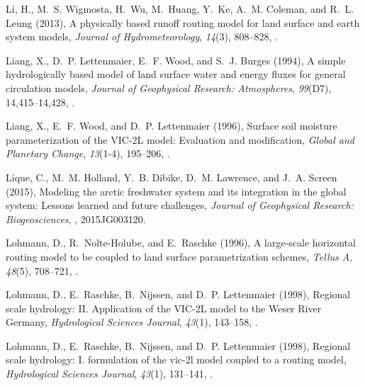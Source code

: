 \documentclass[jgrga, draft]{agutex}
\begin{document}
\begin{article}
\begin{thebibliography}{79}
Li, H., M.~S. Wigmosta, H.~Wu, M.~Huang, Y.~Ke, A.~M. Coleman, and R.~L. Leung
  (2013), A physically based runoff routing model for land surface and earth
  system models, \textit{Journal of Hydrometeorology}, \textit{14}(3),
  808--828, .

Liang, X., D.~P. Lettenmaier, E.~F. Wood, and S.~J. Burges (1994), A simple
  hydrologically based model of land surface water and energy fluxes for
  general circulation models, \textit{Journal of Geophysical Research:
  Atmospheres}, \textit{99}(D7), 14,415--14,428, .

Liang, X., E.~F. Wood, and D.~P. Lettenmaier (1996), {Surface soil moisture
  parameterization of the {VIC}-2L model: Evaluation and modification},
  \textit{Global and Planetary Change}, \textit{13}(1-4), 195--206,
  .

Lique, C., M.~M. Holland, Y.~B. Dibike, D.~M. Lawrence, and J.~A. Screen
  (2015), Modeling the arctic freshwater system and its integration in the
  global system: Lessons learned and future challenges, \textit{Journal of
  Geophysical Research: Biogeosciences}, ,
  2015JG003120.

Lohmann, D., R.~Nolte-Holube, and E.~Raschke (1996), {A large-scale horizontal
  routing model to be coupled to land surface parametrization schemes},
  \textit{Tellus A}, \textit{48}(5), 708--721,
  .

Lohmann, D., E.~Raschke, B.~Nijssen, and D.~P. Lettenmaier
  (1998{}), {Regional scale hydrology: {II}. Application of the
  {VIC}-2L model to the Weser River Germany}, \textit{Hydrological Sciences
  Journal}, \textit{43}(1), 143--158, .

Lohmann, D., E.~Raschke, B.~Nijssen, and D.~P. Lettenmaier
  (1998{}), Regional scale hydrology: I. formulation of the vic-2l
  model coupled to a routing model, \textit{Hydrological Sciences Journal},
  \textit{43}(1), 131--141, .


\end{thebibliography}
\end{article}
\end{document}
